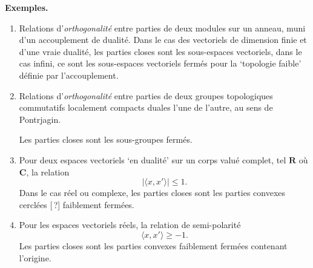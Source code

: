 \noindent\textbf{Exemples.}
\begin{enumerate}[label={\arabic*)}]
\item Relations d'\textit{orthogonalité} entre parties de deux modules sur un anneau, muni d'un accouplement de dualité. Dans le cas des vectoriels de dimension finie et d'une vraie dualité, les parties closes sont les sous-espaces vectoriels, dans le cas infini, ce sont les sous-espaces vectoriels fermés pour la `topologie faible' définie par l'accouplement.
\item Relations d'\textit{orthogonalité} entre parties de deux groupes topologiques commutatifs localement compacts duales l'une de l'autre, au sens de Pontrjagin.

Les parties closes sont les sous-groupes fermés.
\item Pour deux espaces vectoriels `en dualité' sur un corps valué complet, tel $\mathbf{R}$ où $\mathbf{C}$, la relation %
\[
|\langle x, x' \rangle| \leq 1.
\]
Dans le cas réel ou complexe, les parties closes sont les parties convexes cerclées [\,?] faiblement fermées.
\item Pour les espaces vectoriels réels, la relation de semi-polarité
\[
\langle x, x' \rangle \geq -1.
\]
Les parties closes sont les parties convexes faiblement fermées contenant l'origine.
\end{enumerate}

